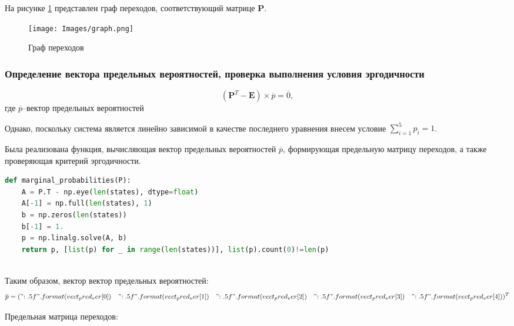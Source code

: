 На рисунке \ref{graph} представлен граф переходов, соответствующий матрице $\mathbf{P}$.
\begin{figure}[!h]
\centerline{\texttt{[image: Images/graph.png]}}
\caption{Граф переходов}
\label{graph}
\end{figure}

\subsubsection{Определение вектора предельных вероятностей, проверка выполнения условия эргодичности}


$$(\mathbf{P}^T-\mathbf{E})\times\overline{p}=\overline{0},$$
где $\overline{p}$--вектор предельных вероятностей

Однако, поскольку система является линейно зависимой в качестве последнего уравнения внесем условие $\sum\limits_{i=1}^5p_i=1$.

Была реализована функция, вычисляющая вектор предельных вероятностей  $\overline{p}$, формирующая предельную матрицу переходов, а также проверяющая критерий эргодичности.

\begin{lstlisting}[language=python, label=prog,caption={\textit{расчет вектора предельных вероятностей}}]
def marginal_probabilities(P):
    A = P.T - np.eye(len(states), dtype=float)
    A[-1] = np.full(len(states), 1)
    b = np.zeros(len(states))
    b[-1] = 1.
    p = np.linalg.solve(A, b)
    return p, [list(p) for _ in range(len(states))], list(p).count(0)!=len(p)
\end{lstlisting}

~\\

Таким образом, вектор вектор предельных вероятностей:
$$\overline{p}=({{ "{:.5f}".format(vect_pred_ver[0]) }}\quad {{ "{:.5f}".format(vect_pred_ver[1]) }}\quad {{ "{:.5f}".format(vect_pred_ver[2]) }}\quad {{ "{:.5f}".format(vect_pred_ver[3]) }}\quad {{ "{:.5f}".format(vect_pred_ver[4]) }})^T$$

Предельная матрица переходов:

